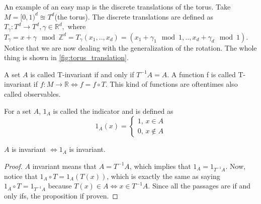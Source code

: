 An example of an easy map is the discrete translations of the torus. Take $M=[0, 1)^d\approxeq T^d$(the torus). The discrete translations are defined as $T_{\gamma}:T^d\rightarrow T^d, \gamma\in\mathbb{R}^d,$ where $ T_{\gamma}=x+\gamma \mod \mathbb{Z}^d=T_{\gamma}(x_1,..,x_d)=(x_1+\gamma_1 \mod 1,..,x_d+\gamma_d \mod 1)$. Notice that we are now dealing with the generalization of the rotation. The whole thing is shown in \autoref{fig:torus_translation}.

\begin{definition}
    A set $A$ is called T-invariant if and only if $T^{-1}A=A$. A function f is called T-invariant if $f:M\rightarrow\mathbb{R}\iff f=f\circ T$. This kind of functions are oftentimes also called observables. 
\end{definition}

\begin{definition}
    For a set $A$, $1_A$ is called the indicator and is defined as \begin{equation*}
    1_A(x)=\begin{cases}
                1,\, x\in A \\
                0,\, x\notin A
            \end{cases}
    \end{equation*}
\end{definition}

\begin{proposition}
    $A$ is invariant $\iff 1_A$ is invariant.
\end{proposition}

\begin{proof}
    $A$ invariant means that $A=T^{-1}A$, which implies that $1_A=1_{T^{-1}A}$. Now, notice that $1_A\circ T=1_A(T(x))$, which is exactly the same as saying $1_A\circ T=1_{T^{-1}A}$ because $T(x)\in A \iff x\in T^{-1}A$. Since all the passages are if and only ifs, the proposition if proven.
\end{proof}  

